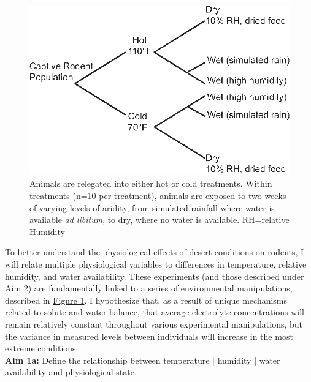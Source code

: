 \documentclass[11pt]{article}
\begin{document}
\begin{figure}
\hypertarget{Figure 1}{}
\vspace{-5mm}
\begin{mdframed}
  \begin{center}
    \includegraphics[width=1\textwidth]{exp_design_fig.eps}
  \end{center}
  \caption{\small{Animals are relegated into either hot or cold treatments. Within treatments (n=10 per treatment), animals are exposed to two weeks of varying levels of aridity, from simulated rainfall where water is available \textit{ad libitum}, to dry, where no water is available. RH=relative Humidity}}
\end{mdframed}
\end{figure}
To better understand the physiological effects of desert conditions on rodents, I will relate multiple physiological variables to differences in temperature, relative humidity, and water availability. These experiments (and those described under Aim 2) are fundamentally linked to a series of environmental manipulations, described in \hyperlink{Figure 1}{Figure 1}. I hypothesize that, as a result of unique mechanisms related to solute and water balance, that average electrolyte concentrations will remain relatively constant throughout various experimental manipulations, but the variance in measured levels between individuals will increase in the most extreme conditions. \\


\noindent \textbf{Aim 1a:} Define the relationship between temperature | humidity | water availability and physiological state. \\
\end{document}
